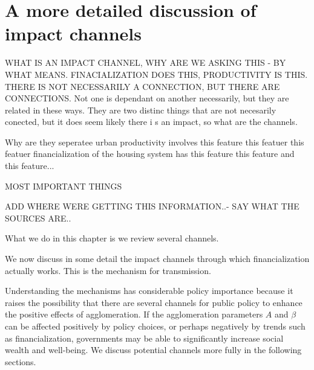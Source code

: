 
\section{A more detailed  discussion of impact channels}

WHAT IS AN IMPACT CHANNEL, WHY ARE WE ASKING THIS - BY WHAT MEANS. FINACIALIZATION DOES THIS, PRODUCTIVITY IS THIS. THERE IS NOT NECESSARILY A CONNECTION, BUT THERE ARE CONNECTIONS. 
Not one is dependant on another necessarily, but they are related in these ways.
They are two distinc things that are not necesarily conected, but it does seem likely there i s an impact, so what are the channels. 

Why are they seperatee 
urban productivity involves this feature this featuer this featuer
financialization of the housing system has this feature this feature and this feature...

MOST IMPORTANT THINGS

ADD WHERE WERE GETTING THIS INFORMATION..- SAY WHAT THE SOURCES ARE..


What we do in this chapter is we review several channels.

We now discuss in some detail the impact channels through which financialization actually works. This is the mechanism for transmission.

Understanding the mechanisms has considerable policy importance because it raises the possibility that there are several channels for public policy to enhance the positive effects of agglomeration. If the agglomeration parameters $A$ and  $\beta$ can be affected positively by policy choices, or perhaps negatively by trends such as financialization,  governments may be able to significantly increase social wealth and well-being. We discuss potential channels more fully in the following sections. 

